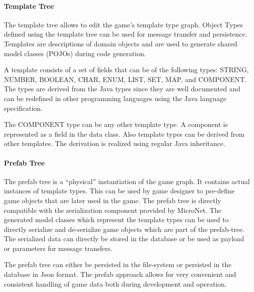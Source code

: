 \paragraph{Template Tree}

The template tree allows to edit the game's template type graph. Object Types
defined using the template tree can be used for message transfer and
persistence. Templates are descriptions of domain objects and are used to
generate shared model classes (POJOs) during code generation.

A template consists of a set of fields that can be of the following types:
STRING, NUMBER, BOOLEAN, CHAR, ENUM, LIST, SET, MAP, and COMPONENT. The types
are derived from the Java types since they are well documented and can be
redefined in other programming languages using the Java language specification.

The COMPONENT type can be any other template type. A component is represented as
a field in the data class. Also template types can be derived from
other templates. The derivation is realized using regular Java inheritance.


\paragraph{Prefab Tree}

The prefab tree is a ``physical'' instantiation of the game graph. It contains
actual instances of template types. This can be used by game designer to
pre-define game objects that are later used in the game. The prefab tree is
directly compatible with the serialization component provided by MicroNet. The
generated model classes which represent the template types can be used to
directly serialize and de-serialize game objects which are part of the
prefab-tree. The serialized data can directly be stored in the database or
be used as payload or parameters for message transfers.

The prefab tree can either be persisted in the file-system or persisted in the
database in Json format. The prefab approach allows for very convenient and
consistent handling of game data both during development and operation.


